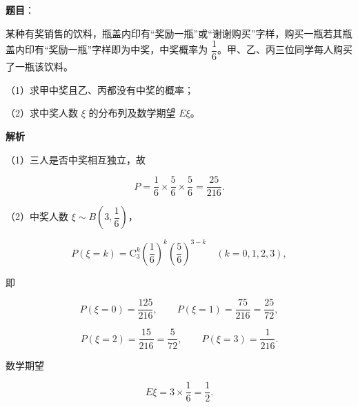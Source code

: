 \begin{answer}

\textbf{题目}：

某种有奖销售的饮料，瓶盖内印有“奖励一瓶”或“谢谢购买”字样，购买一瓶若其瓶盖内印有“奖励一瓶”字样即为中奖，中奖概率为 $\dfrac{1}{6}$。甲、乙、丙三位同学每人购买了一瓶该饮料。

（1）求甲中奖且乙、丙都没有中奖的概率；

（2）求中奖人数 $\xi$ 的分布列及数学期望 $E\xi$。

\textbf{解析}

（1）三人是否中奖相互独立，故

\nopagebreak[4]
\[P=\frac16\times\frac56\times\frac56=\frac{25}{216}.\]

（2）中奖人数 $\xi\sim B\left(3,\dfrac16\right)$，

\nopagebreak[4]
\[P(\xi=k)=\mathrm C_3^k\left(\frac16\right)^k\left(\frac56\right)^{3-k}\quad(k=0,1,2,3),\]

即

\nopagebreak[4]
\[P(\xi=0)=\frac{125}{216},\qquad P(\xi=1)=\frac{75}{216}=\frac{25}{72},\]

\nopagebreak[4]
\[P(\xi=2)=\frac{15}{216}=\frac5{72},\qquad P(\xi=3)=\frac1{216}.\]

数学期望

\nopagebreak[4]
\[E\xi=3\times\frac16=\frac12.\]


\end{answer}
